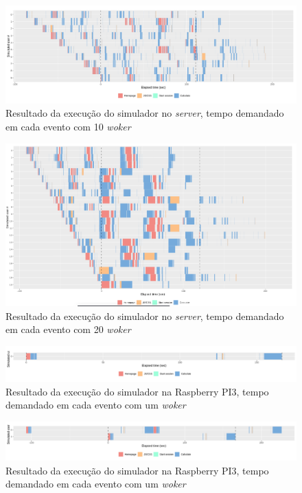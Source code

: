 \documentclass[12pt,english,brazil]{article}
\begin{document}
\begin{figure}[htbp]
  \centering 
  \includegraphics[scale=.4]{paperWSCAD2021/figures/user_x64_10_worker.png}
  \caption{Resultado da execução do simulador no \emph{server}, tempo demandado em cada evento com 10 \emph{woker}}
  \label{x64_10wroker}
\end{figure}

\begin{figure}[htbp]
  \centering 
  \includegraphics[scale=.4]{paperWSCAD2021/figures/user_x64_20_worker.png}
  \caption{Resultado da execução do simulador no \emph{server}, tempo demandado em cada evento com 20 \emph{woker}}
  \label{x64_20wroker}
\end{figure}

\begin{figure}[htbp]
  \centering 
  \includegraphics[scale=.4]{paperWSCAD2021/figures/user_PI3_1_worker.png}
  \caption{Resultado da execução do simulador na Raspberry PI3, tempo demandado em cada evento com um \emph{woker}}
  \label{PI3_1wroker}
\end{figure}

\begin{figure}[htbp]
  \centering 
  \includegraphics[scale=.4]{paperWSCAD2021/figures/user_PI3_2_worker.png}
  \caption{Resultado da execução do simulador na Raspberry PI3, tempo demandado em cada evento com um \emph{woker}}
  \label{PI3_2wroker}
\end{figure}
\end{document}
